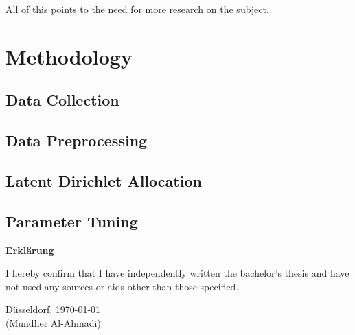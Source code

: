\documentclass[12pt,english,titlepage,a4paper]{article}
\begin{document}
All of this points to the need for more research on the subject. 


\pagebreak


\section{Methodology}

\subsection{Data Collection}

\subsection{Data Preprocessing}

\subsection{Latent Dirichlet Allocation}

\subsection{Parameter Tuning}



\pagebreak





\pagebreak\noindent
\textbf{\LARGE Erkl\"arung}

\bigskip\bigskip
\noindent 
I hereby confirm that I have independently written the 
bachelor's thesis and have not used any sources or aids 
other than those specified.
\bigskip
\noindent

\bigskip\bigskip\bigskip
\noindent
D\"usseldorf, \today \\
(Mundher Al-Ahmadi)

% 
\end{document}
